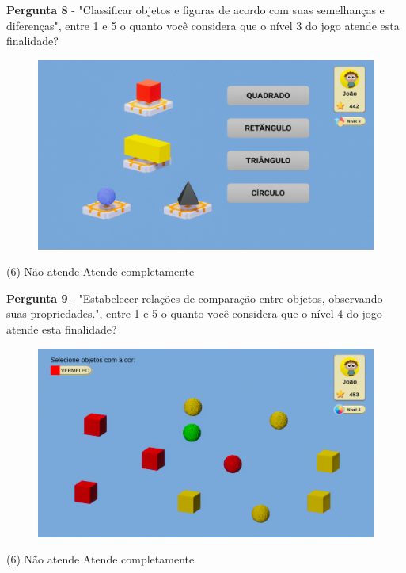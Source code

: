 \documentclass[article,12pt,openany,oneside,a4paper,english,brazil]{abntex2}
\begin{document}
\textbf{Pergunta 8} - "Classificar objetos e figuras de acordo com suas semelhanças e diferenças", entre 1 e 5 o quanto você considera que o nível 3 do jogo atende esta finalidade?

\begin{figure}[H]
    \centering
    \label{fig:aluno_pergunta_5}
    \includegraphics[width=0.8\linewidth]{GameScreenshots/Level3.png}
\end{figure}

\normalfont
\begin{tasks}[style=enumerate, item-format={\normalfont\tiny}, after-item-skip=4mm](6)
\task Não atende
\task 
\task 
\task 
\task Atende completamente
\end{tasks}

\textbf{Pergunta 9} - "Estabelecer relações de comparação entre objetos, observando suas propriedades.", entre 1 e 5 o quanto você considera que o nível 4 do jogo atende esta finalidade?

\begin{figure}[H]
    \centering
    \label{fig:aluno_pergunta_5}
    \includegraphics[width=0.8\linewidth]{GameScreenshots/Level4.png}
\end{figure}

\normalfont
\begin{tasks}[style=enumerate, item-format={\normalfont\tiny}, after-item-skip=4mm](6)
\task Não atende
\task 
\task 
\task 
\task Atende completamente
\end{tasks}
\end{document}
